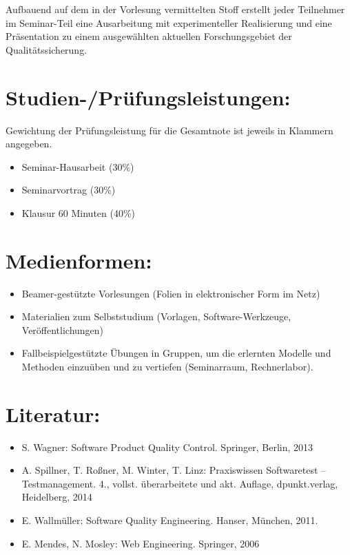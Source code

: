 Aufbauend auf dem in der Vorlesung vermittelten Stoff erstellt jeder
Teilnehmer im Seminar-Teil eine Ausarbeitung mit experimenteller
Realisierung und eine Präsentation zu einem ausgewählten aktuellen
Forschungsgebiet der Qualitätssicherung.

\section*{Studien-/Prüfungsleistungen:}\label{studien-pruxfcfungsleistungen-21}

Gewichtung der Prüfungsleistung für die Gesamtnote ist jeweils in
Klammern angegeben.

\begin{itemize}
\tightlist
\item
  Seminar-Hausarbeit (30\%)
\item
  Seminarvortrag (30\%)
\item
  Klausur 60 Minuten (40\%)
\end{itemize}

\section*{Medienformen:}\label{medienformen-21}

\begin{itemize}
\tightlist
\item
  Beamer-gestützte Vorlesungen (Folien in elektronischer Form im Netz)
\item
  Materialien zum Selbststudium (Vorlagen, Software-Werkzeuge,
  Veröffentlichungen)
\item
  Fallbeispielgestützte Übungen in Gruppen, um die erlernten Modelle und
  Methoden einzuüben und zu vertiefen (Seminarraum, Rechnerlabor).
\end{itemize}

\section*{Literatur:}\label{literatur-21}

\begin{itemize}
\tightlist
\item
  S. Wagner: Software Product Quality Control. Springer, Berlin, 2013
\item
  A. Spillner, T. Roßner, M. Winter, T. Linz: Praxiswissen Softwaretest
  -- Testmanagement. 4., vollst. überarbeitete und akt. Auflage,
  dpunkt.verlag, Heidelberg, 2014
\item
  E. Wallmüller: Software Quality Engineering. Hanser, München, 2011.
\item
  E. Mendes, N. Mosley: Web Engineering. Springer, 2006
\end{itemize}

